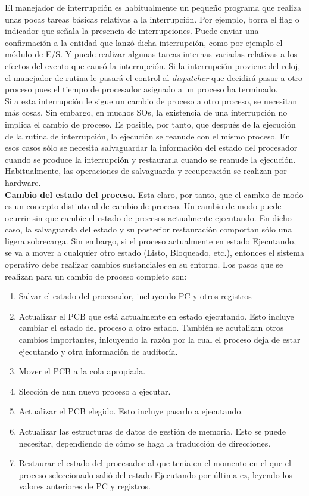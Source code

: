 \documentclass{article}
\begin{document}
				El manejador de interrupción es
habitualmente un pequeño programa que realiza unas pocas tareas básicas relativas a la interrupción. Por ejemplo, borra el flag o indicador que señala la presencia de interrupciones. Puede enviar una confirmación a la entidad que lanzó dicha interrupción, como por ejemplo el módulo de E/S. Y puede realizar algunas tareas internas variadas relativas a los efectos del evento que causó la interrupción. Si la interrupción proviene del reloj, el manejador de rutina le  pasará el control al \textit{dispatcher} que decidirá pasar a otro proceso pues el tiempo de procesador asignado a un proceso ha terminado. \\
				
				Si a esta interrupción le sigue un cambio de proceso a otro proceso, se necesitan más cosas. Sin embargo, en muchos SOs, la existencia de una interrupción no implica el cambio de proceso. Es posible, por tanto, que después de la ejecución de la rutina de interrupción, la ejecución se reanude con el mismo proceso. En esos casos sólo se necesita salvaguardar la información del estado del procesador cuando se produce la interrupción y restaurarla cuando se reanude la ejecución. Habitualmente, las operaciones de salvaguarda y recuperación se realizan por hardware. \\
				
				\textbf{Cambio del estado del proceso.} Esta claro, por tanto, que el cambio de modo es un concepto distinto al de cambio de proceso. Un cambio de modo puede ocurrir sin que cambie el estado de procesos actualmente ejecutando. En dicho caso, la salvaguarda del estado y su posterior restauración comportan sólo una ligera sobrecarga. Sin embargo, si el proceso actualmente en estado Ejecutando, se va a mover a cualquier otro estado (Listo, Bloqueado, etc.), entonces el sistema operativo debe realizar cambios sustanciales en su entorno. Los pasos que se realizan para un cambio de proceso completo son:
				
				\begin{enumerate}
				\item Salvar el estado del procesador, incluyendo PC y otros registros
				\item Actualizar el PCB que está actualmente en estado ejecutando. Esto incluye cambiar el estado del proceso a otro estado. También se acutalizan otros cambios importantes, inlcuyendo la razón por la cual el proceso deja de estar ejecutando y otra información de auditoría.
				\item Mover el PCB a la cola apropiada.
				\item Slección de nun nuevo proceso a ejecutar.
				\item Actualizar el PCB elegido. Esto incluye pasarlo a ejecutando.
				\item Actualizar las estructuras de datos de gestión de memoria. Esto se puede necesitar, dependiendo de cómo se haga la traducción de direcciones.
				\item Restaurar el estado del procesador al que tenía en el momento en el que el proceso seleccionado salió del estado Ejecutando por última ez, leyendo los valores anteriores de PC y registros.
				\end{enumerate}
				
\end{document}
